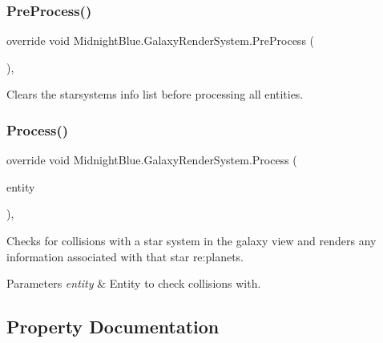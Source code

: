 \subsubsection{\texorpdfstring{Pre\+Process()}{PreProcess()}}
{\footnotesize\ttfamily override void Midnight\+Blue.\+Galaxy\+Render\+System.\+Pre\+Process (\begin{DoxyParamCaption}{ }\end{DoxyParamCaption})\hspace{0.3cm}{\ttfamily [inline]}, {\ttfamily [protected]}}



Clears the starsystems info list before processing all entities. 

\hypertarget{class_midnight_blue_1_1_galaxy_render_system_aabbf61a4bcfb7c026d2d0c9fbe90569f}{}\label{class_midnight_blue_1_1_galaxy_render_system_aabbf61a4bcfb7c026d2d0c9fbe90569f} 
\subsubsection{\texorpdfstring{Process()}{Process()}}
{\footnotesize\ttfamily override void Midnight\+Blue.\+Galaxy\+Render\+System.\+Process (\begin{DoxyParamCaption}\item[{Entity}]{entity }\end{DoxyParamCaption})\hspace{0.3cm}{\ttfamily [inline]}, {\ttfamily [protected]}}



Checks for collisions with a star system in the galaxy view and renders any information associated with that star re\+:planets. 


\begin{DoxyParams}{Parameters}
{\em entity} & Entity to check collisions with.\\
\hline
\end{DoxyParams}


\subsection{Property Documentation}
\hypertarget{class_midnight_blue_1_1_galaxy_render_system_a2f252c64ec38b5bcf20c6b276fd5809b}{}\label{class_midnight_blue_1_1_galaxy_render_system_a2f252c64ec38b5bcf20c6b276fd5809b} 
